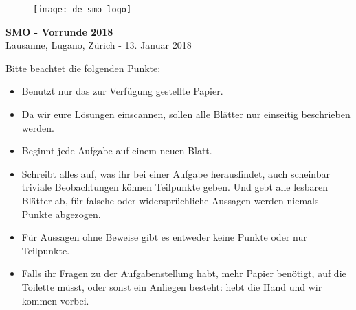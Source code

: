 \documentclass[12pt,a4paper]{article}
\begin{document}
\thispagestyle{empty}
\begin{figure}[h]
\texttt{[image: de-smo\_logo]}
\end{figure}

\vspace{1cm}

\begin{center}
\Huge{\textbf{SMO - Vorrunde 2018}}\\[1.5cm]
\large{Lausanne, Lugano, Zürich - 13. Januar 2018}\\[2.5cm]
\end{center}


Bitte beachtet die folgenden Punkte:

\begin{itemize}
\item Benutzt nur das zur Verfügung gestellte Papier.

\item Da wir eure Lösungen einscannen, sollen alle Blätter nur einseitig beschrieben werden. 

\item Beginnt jede Aufgabe auf einem neuen Blatt.

\item Schreibt alles auf, was ihr bei einer Aufgabe herausfindet, auch scheinbar triviale Beobachtungen können Teilpunkte geben. Und gebt alle lesbaren Blätter ab, für falsche oder widersprüchliche Aussagen werden niemals Punkte abgezogen.

\item Für Aussagen ohne Beweise gibt es entweder keine Punkte oder nur Teilpunkte.


\item Falls ihr Fragen zu der Aufgabenstellung habt, mehr Papier benötigt, auf die Toilette müsst, oder sonst ein Anliegen besteht: hebt die Hand und wir kommen vorbei.



\end{itemize}
\end{document}
